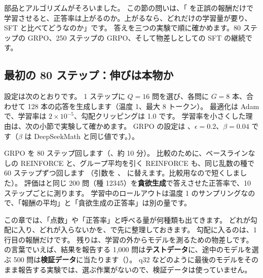 部品とアルゴリズムがそろいました。
この節の問いは、「 を正誤の報酬だけで学習させると、正答率は上がるのか。上がるなら、どれだけの学習量が要り、SFT と比べてどうなのか」です。
答えを三つの実験で順に確かめます。80 ステップの GRPO、250 ステップの GRPO、そして物差しとしての SFT の継続です。

\subsection{最初の 80 ステップ：伸びは本物か}

設定は次のとおりです。
1 ステップに $Q=16$ 問を選び、各問に $G=8$ 本、合わせて 128 本の応答を生成します（温度 1、最大 8 トークン）。
最適化は Adam で、学習率は $2\times10^{-5}$、勾配クリッピングは 1.0 です。
学習率を小さくした理由は、次の小節で実験して確かめます。
GRPO の設定は 、$\epsilon=0.2$、$\beta=0.04$ です（$\beta$ は DeepSeekMath と同じ値です。）。

GRPO を 80 ステップ回します（、約 10 分）。
比較のために、ベースラインなしの REINFORCE と、グループ平均を引く REINFORCE も、同じ乱数の種で 60 ステップずつ回します
（引数を 、 に替えます。比較用なので短くしました）。
評価はと同じ 200 問（種 12345）を\textbf{貪欲生成}で答えさせた正答率で、10 ステップごとに測ります。
学習中のロールアウトは温度 1 のサンプリングなので、「報酬の平均」と「貪欲生成の正答率」は別の量です。

この章では、「点数」や「正答率」と呼べる量が何種類も出てきます。
どれが勾配に入り、どれが入らないかを、で先に整理しておきます。
勾配に入るのは、1 行目の報酬だけです。
残りは、学習の外からモデルを測るための物差しです。
の言葉でいえば、結果を報告する 1,000 問は\textbf{テストデータ}に、途中のモデルを選ぶ 500 問は\textbf{検証データ}に当たります（）。
q32 などのように最後のモデルをそのまま報告する実験では、選ぶ作業がないので、検証データは使っていません。

